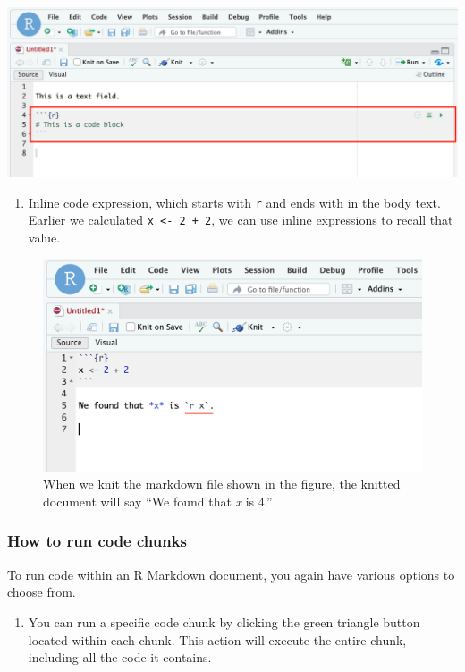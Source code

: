 \documentclass[
]{book}
\providecommand{\tightlist}{%
  \setlength{\itemsep}{0pt}\setlength{\parskip}{0pt}}
\begin{document}
\includegraphics{images/rmd_codeblock_2.png}

\begin{enumerate}
\def\labelenumi{\arabic{enumi}.}
\setcounter{enumi}{2}
\tightlist
\item
  Inline code expression, which starts with \texttt{\textasciigrave{}r} and ends with \texttt{\textasciigrave{}} in the body text. Earlier we calculated \texttt{x\ \textless{}-\ 2\ +\ 2}, we can use inline expressions to recall that value.
\end{enumerate}

\begin{figure}
\centering
\includegraphics{images/inline_code.png}
\caption{When we knit the markdown file shown in the figure, the knitted document will say ``We found that \emph{x} is 4.''}
\end{figure}

\hypertarget{how-to-run-code-chunks}{%
\subsubsection{How to run code chunks}\label{how-to-run-code-chunks}}

To run code within an R Markdown document, you again have various options to choose from.

\begin{enumerate}
\def\labelenumi{\arabic{enumi}.}
\tightlist
\item
  You can run a specific code chunk by clicking the green triangle button located within each chunk. This action will execute the entire chunk, including all the code it contains.
\end{enumerate}
\end{document}
